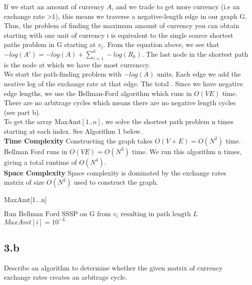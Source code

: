 \documentclass[11pt]{article}
\begin{document}
\begin{solution}
If we start an amount of currency $A$, and we trade to get more currency (i.e an exchange rate >1), this means we traverse a negative-length edge in our graph G.  Thus, the problem of finding the maximum amount of currency you can obtain starting with one unit of currency i is equivalent to the single source shortest paths problem in G starting at $v_i$. From the equation above, we see that $-log(A')=-log(A)+\sum_{i=1}^{k} -log(R_k)$. The last node in the shortest path is the node at which we have the most currenccy. \\ 

We start the path-finding problem with $-log(A)$ units. Each edge we add the neative log of the exchange rate at that edge. The total . Since we have negative edge lengths, we use the Bellman-Ford algorithm which runs in $O(VE)$ time. There are no arbitrage cycles which means there are no negative length cycles (see part b).  \\

To get the array MaxAmt$[1..n]$, we solve the shortest path problem n times starting at each index. See Algorithm 1 below. \\

\textbf{Time Complexity}
Constructing the graph takes $O(V+E)=O(N^2)$ time.
Bellman Ford runs in $O(VE)=O(N^3)$ time. We run this algorithm n times, giving a total runtime of $O(N^4)$. \\

\textbf{Space Complexity} 
Space complexity is dominated by the exchange rates matrix of size $O(N^2)$ used to construct the graph.

\begin{algorithm}
\caption{MaxAmt[1...n]}
\begin{algorithmic}
\STATE $\text{Run Bellman Ford SSSP on G from }v_i \text{ resulting in path length } L$
\STATE $MaxAmt[i] = 10^{-L}$
\ENDFOR
\end{algorithmic}
\end{algorithm} 


\end{solution}

\clearpage



\subsection *{3.b} Describe an algorithm to determine whether the given matrix of currency exchange rates creates an arbitrage cycle. 
\end{document}
